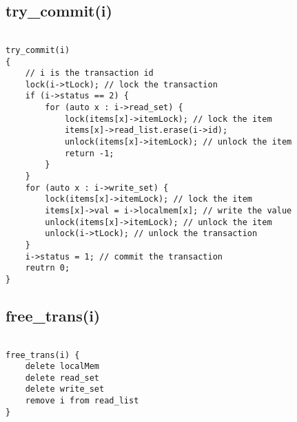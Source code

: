 \documentclass[12pt]{article}
\begin{document}
\subsection*{try\_commit(i)}

\begin{lstlisting}
    
try_commit(i)
{
    // i is the transaction id
    lock(i->tLock); // lock the transaction
    if (i->status == 2) {
        for (auto x : i->read_set) {
            lock(items[x]->itemLock); // lock the item
            items[x]->read_list.erase(i->id); 
            unlock(items[x]->itemLock); // unlock the item
            return -1;
        }
    }
    for (auto x : i->write_set) {
        lock(items[x]->itemLock); // lock the item
        items[x]->val = i->localmem[x]; // write the value
        unlock(items[x]->itemLock); // unlock the item
        unlock(i->tLock); // unlock the transaction
    }
    i->status = 1; // commit the transaction
    reutrn 0;
}

\end{lstlisting}

\subsection*{free\_trans(i)}

\begin{lstlisting}
    
free_trans(i) {
    delete localMem 
    delete read_set
    delete write_set
    remove i from read_list
}

\end{lstlisting}
\end{document}
